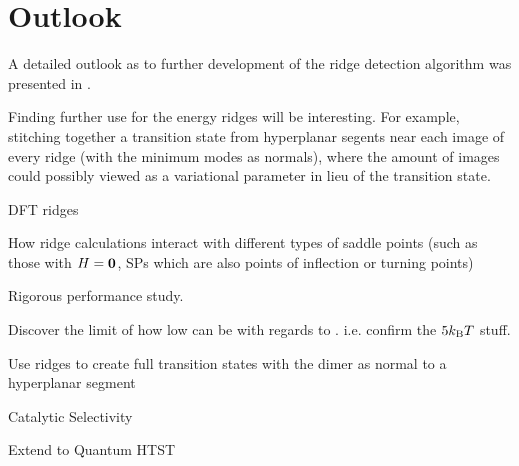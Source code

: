 \section{Outlook}
\label{sec:summary-outlook}

A detailed outlook as to further development of the ridge detection algorithm was presented in .


Finding further use for the energy ridges will be interesting.
For example, stitching together a transition state from hyperplanar segents near each image of every ridge (with the minimum modes as normals), where the amount of images could possibly viewed as a variational parameter in lieu of the transition state.


\bit
\item DFT ridges
\item How ridge calculations interact with different types of saddle points (such as those with $H = {\mathrm{\mathbf{\bm{0}}}}$, SPs which are also points of inflection or turning points)
\item Rigorous performance study.
\item Discover the limit of how low  can be with regards to . i.e. confirm the $5k_\text{B} T$ stuff.
\item Use ridges to create full transition states with the dimer as normal to a hyperplanar segment
\item Catalytic Selectivity
\item Extend to Quantum HTST
\eit

\placeholder
